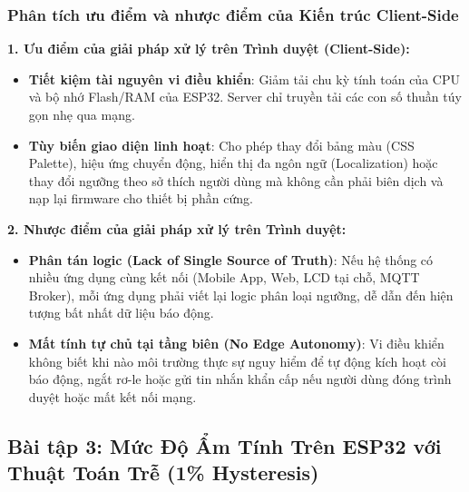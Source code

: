 \subsubsection{Phân tích ưu điểm và nhược điểm của Kiến trúc Client-Side}
\begin{tcolorbox}[colback=blue!5,colframe=blue!75!black,title=\textbf{So sánh kiến trúc: Đánh giá ngưỡng trên Trình duyệt vs. trên Vi điều khiển ESP32}]
\textbf{1. Ưu điểm của giải pháp xử lý trên Trình duyệt (Client-Side):}
\begin{itemize}[leftmargin=*]
    \item \textbf{Tiết kiệm tài nguyên vi điều khiển}: Giảm tải chu kỳ tính toán của CPU và bộ nhớ Flash/RAM của ESP32. Server chỉ truyền tải các con số thuần túy gọn nhẹ qua mạng.
    \item \textbf{Tùy biến giao diện linh hoạt}: Cho phép thay đổi bảng màu (CSS Palette), hiệu ứng chuyển động, hiển thị đa ngôn ngữ (Localization) hoặc thay đổi ngưỡng theo sở thích người dùng mà không cần phải biên dịch và nạp lại firmware cho thiết bị phần cứng.
\end{itemize}
\textbf{2. Nhược điểm của giải pháp xử lý trên Trình duyệt:}
\begin{itemize}[leftmargin=*]
    \item \textbf{Phân tán logic (Lack of Single Source of Truth)}: Nếu hệ thống có nhiều ứng dụng cùng kết nối (Mobile App, Web, LCD tại chỗ, MQTT Broker), mỗi ứng dụng phải viết lại logic phân loại ngưỡng, dễ dẫn đến hiện tượng bất nhất dữ liệu báo động.
    \item \textbf{Mất tính tự chủ tại tầng biên (No Edge Autonomy)}: Vi điều khiển không biết khi nào môi trường thực sự nguy hiểm để tự động kích hoạt còi báo động, ngắt rơ-le hoặc gửi tin nhắn khẩn cấp nếu người dùng đóng trình duyệt hoặc mất kết nối mạng.
\end{itemize}
\end{tcolorbox}

\newpage
\subsection{Bài tập 3: Mức Độ Ẩm Tính Trên ESP32 với Thuật Toán Trễ (1\% Hysteresis)}

